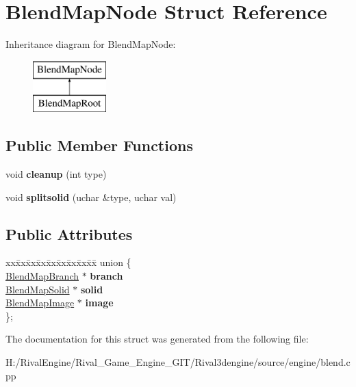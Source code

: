 \hypertarget{struct_blend_map_node}{}\section{Blend\+Map\+Node Struct Reference}
\label{struct_blend_map_node}
Inheritance diagram for Blend\+Map\+Node\+:\begin{figure}[H]
\begin{center}
\leavevmode
\includegraphics[height=2.000000cm]{struct_blend_map_node}
\end{center}
\end{figure}
\subsection*{Public Member Functions}
\begin{DoxyCompactItemize}
\item 
\mbox{\label{struct_blend_map_node_a81d8023d5abe4d61e596511ff9338e1f}} 
void {\bfseries cleanup} (int type)
\item 
\mbox{\label{struct_blend_map_node_ac89dbc56181a3eb63f57aac3a5784fe7}} 
void {\bfseries splitsolid} (uchar \&type, uchar val)
\end{DoxyCompactItemize}
\subsection*{Public Attributes}
\begin{DoxyCompactItemize}
\item 
\mbox{\label{struct_blend_map_node_aafabf99c170ee0343131fa06919ae770}} 
\begin{tabbing}
xx\=xx\=xx\=xx\=xx\=xx\=xx\=xx\=xx\=\kill
union \{\\
\>\hyperlink{struct_blend_map_branch}{BlendMapBranch} $\ast$ {\bfseries branch}\\
\>\hyperlink{struct_blend_map_solid}{BlendMapSolid} $\ast$ {\bfseries solid}\\
\>\hyperlink{struct_blend_map_image}{BlendMapImage} $\ast$ {\bfseries image}\\
\}; \\

\end{tabbing}\end{DoxyCompactItemize}


The documentation for this struct was generated from the following file\+:\begin{DoxyCompactItemize}
\item 
H\+:/\+Rival\+Engine/\+Rival\+\_\+\+Game\+\_\+\+Engine\+\_\+\+G\+I\+T/\+Rival3dengine/source/engine/blend.\+cpp\end{DoxyCompactItemize}
